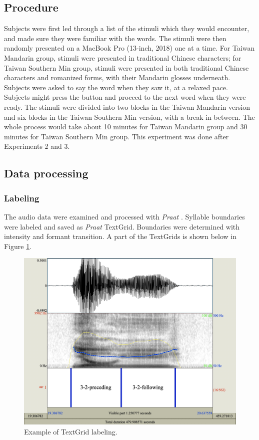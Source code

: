 \subsection{Procedure}
Subjects were first led through a list of the stimuli which they would encounter, and made sure they were familiar with the words. The stimuli were then randomly presented on a MacBook Pro (13-inch, 2018) one at a time. For Taiwan Mandarin group, stimuli were presented in traditional Chinese characters; for Taiwan Southern Min group, stimuli were presented in both traditional Chinese characters and romanized forms, with their Mandarin glosses underneath. Subjects were asked to say the word when they saw it, at a relaxed pace. Subjects might press the button and proceed to the next word when they were ready. The stimuli were divided into two blocks in the Taiwan Mandarin version and six blocks in the Taiwan Southern Min version, with a break in between. The whole process would take about 10 minutes for Taiwan Mandarin group and 30 minutes for Taiwan Southern Min group. This experiment was done after Experiments 2 and 3.

\subsection{Data processing}
\subsubsection{Labeling}
The audio data were examined and processed with \textit{Praat} \citep{BoersmaWeenink2018}. Syllable boundaries were labeled and saved as \textit{Praat} TextGrid. Boundaries were determined with intensity and formant transition. A part of the TextGrids is shown below in Figure \ref{Figure:TextGridExample}.

\begin{figure}[hbt!]
\centering
\includegraphics[width=\textwidth]{figures/E1/TextGridExample.jpg}
\caption{Example of TextGrid labeling.}
\label{Figure:TextGridExample}
\end{figure}

